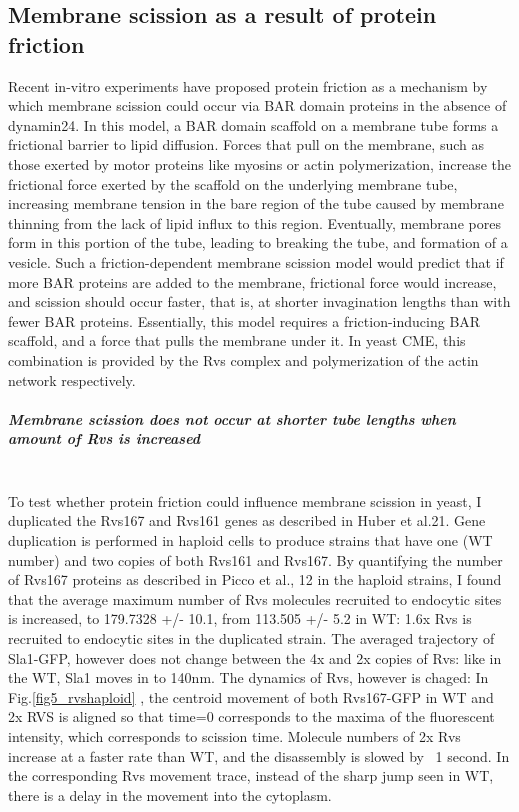 	
	\subsection{Membrane scission as a result of protein friction}
	
	Recent in-vitro experiments have proposed protein friction as a mechanism by which membrane scission could occur via BAR domain proteins in the absence of dynamin24. In this model, a BAR domain scaffold on a membrane tube forms a frictional barrier to lipid diffusion. Forces that pull on the membrane, such as those exerted by motor proteins like myosins or actin polymerization, increase the frictional force exerted by the scaffold on the underlying membrane tube, increasing membrane tension in the bare region of the tube caused by membrane thinning from the lack of lipid influx to this region. Eventually, membrane pores form in this portion of the tube, leading to breaking the tube, and formation of a vesicle. Such a friction-dependent membrane scission model would predict that if more BAR proteins are added to the membrane, frictional force would increase, and scission should occur faster, that is, at shorter invagination lengths than with fewer BAR proteins. Essentially, this model requires a friction-inducing BAR scaffold, and a force that pulls the membrane under it. In yeast CME, this combination is provided by the Rvs complex and polymerization of the actin network respectively. 
	


		\subparagraph{Membrane scission does not occur at shorter tube lengths when amount of Rvs is increased}
		\mbox{}\\
		To test whether protein friction could influence membrane scission in yeast, I duplicated the Rvs167 and Rvs161 genes as described in Huber et al.21. Gene duplication is performed in haploid cells to produce strains that have one (WT number) and two copies of both Rvs161 and Rvs167. By quantifying the number of Rvs167 proteins as described in Picco et al., 12  in the haploid strains, I found that the average maximum number of Rvs molecules recruited to endocytic sites is increased, to 179.7328 +/- 10.1, from 113.505 +/- 5.2 in WT:  1.6x Rvs is recruited to endocytic sites in the duplicated strain. The averaged trajectory of Sla1-GFP, however does not change between the 4x and 2x copies of Rvs: like in the WT, Sla1 moves in to 140nm. The dynamics of Rvs, however is chaged: In Fig.\ref{fig5_rvshaploid} , the centroid movement of both Rvs167-GFP in WT and 2x RVS is aligned so that time=0 corresponds to the maxima of the fluorescent intensity, which corresponds to scission time. Molecule numbers of 2x Rvs increase at a faster rate than WT, and the disassembly is slowed by ~1 second. In the corresponding Rvs movement trace, instead of the sharp jump seen in WT, there is a delay in the movement into the cytoplasm.
		
